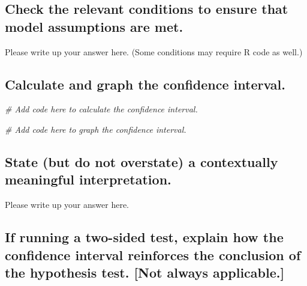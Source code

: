 \documentclass[
]{book}
\newenvironment{Shaded}{\begin{snugshade}}{\end{snugshade}}
\newcommand{\CommentTok}[1]{\textcolor[rgb]{0.56,0.35,0.01}{\textit{#1}}}
\begin{document}
\hypertarget{check-the-relevant-conditions-to-ensure-that-model-assumptions-are-met.-6}{%
\subsection*{Check the relevant conditions to ensure that model assumptions are met.}\label{check-the-relevant-conditions-to-ensure-that-model-assumptions-are-met.-6}}

Please write up your answer here. (Some conditions may require R code as well.)

\hypertarget{calculate-and-graph-the-confidence-interval.-1}{%
\subsection*{Calculate and graph the confidence interval.}\label{calculate-and-graph-the-confidence-interval.-1}}

\begin{Shaded}
\begin{Highlighting}[]
\CommentTok{\# Add code here to calculate the confidence interval.}
\end{Highlighting}
\end{Shaded}

\begin{Shaded}
\begin{Highlighting}[]
\CommentTok{\# Add code here to graph the confidence interval.}
\end{Highlighting}
\end{Shaded}

\hypertarget{state-but-do-not-overstate-a-contextually-meaningful-interpretation.-2}{%
\subsection*{State (but do not overstate) a contextually meaningful interpretation.}\label{state-but-do-not-overstate-a-contextually-meaningful-interpretation.-2}}

Please write up your answer here.

\hypertarget{if-running-a-two-sided-test-explain-how-the-confidence-interval-reinforces-the-conclusion-of-the-hypothesis-test.-not-always-applicable.-1}{%
\subsection*{If running a two-sided test, explain how the confidence interval reinforces the conclusion of the hypothesis test. {[}Not always applicable.{]}}\label{if-running-a-two-sided-test-explain-how-the-confidence-interval-reinforces-the-conclusion-of-the-hypothesis-test.-not-always-applicable.-1}}
\end{document}
